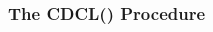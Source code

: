 \begin{frame}
  \vfill

\end{frame}

\begin{frame}
  \frametitle{The CDCL(\T) Procedure}

  \begin{columns}
    \begin{column}{.35\textwidth}
      \vspace{-70pt}
      \scalebox{.3}{}
    \end{column}

    \begin{column}{.60\textwidth}
      \vspace{70pt}
      \scalebox{.3}{}
    \end{column}

  \end{columns}

\end{frame}
